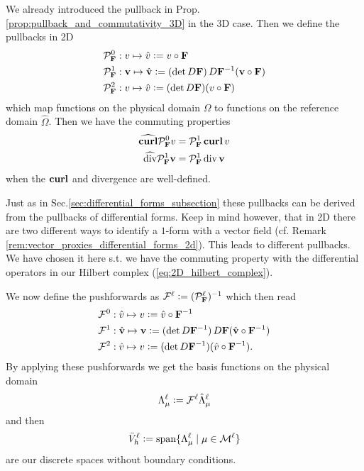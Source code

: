\documentclass[../master_thesis.tex]{subfiles}
\begin{document}
We already introduced the pullback in Prop.\,\ref{prop:pullback_and_commutativity_3D} in the 3D case. 
Then we define the pullbacks in 2D
\begin{align*}
    &\mathcal{P}_\mathbf{F}^0: v \mapsto \hat{v} \vcentcolon= v \circ \mathbf{F}
    \\ &\mathcal{P}_\mathbf{F}^1: \mathbf{v} \mapsto \hat{\mathbf{v}} 
        \vcentcolon= (\det D\mathbf{F} )\,D\mathbf{F}^{-1} (\mathbf{v} \circ \mathbf{F})
    \\ &\mathcal{P}_\mathbf{F}^2: v \mapsto \hat{v} \vcentcolon= (\det D\mathbf{F}) (v\circ \mathbf{F})
\end{align*}
which map functions on the physical domain $\Omega$ to functions on the reference domain 
$\hat{\Omega}$. Then we have the commuting properties
\begin{align*}
    \widehat{\veccurl} \mathcal{P}_\mathbf{F}^0 v &= \mathcal{P}_\mathbf{F}^1 \veccurl v
    \\ \widehat{\diver} \mathcal{P}_\mathbf{F}^1 \mathbf{v} &= \mathcal{P}_\mathbf{F}^1 \diver \mathbf{v}
\end{align*}
when the $\veccurl$ and divergence are well-defined.
\begin{remark}
    Just as in Sec.\ref{sec:differential_forms_subsection} 
    these pullbacks can be derived from the pullbacks of differential forms.
    Keep in mind however, that in 2D there are two different ways to identify a $1$-form 
    with a vector field (cf. Remark \ref{rem:vector_proxies_differential_forms_2d}). 
    This leads to different pullbacks. We have chosen it 
    here s.t. we have the commuting property with the differential operators in 
    our Hilbert complex (\ref{eq:2D_hilbert_complex}).
\end{remark}

We now define the pushforwards as 
$\mathcal{F}^\ell \vcentcolon= (\mathcal{P}_\mathbf{F}^\ell)^{-1}$ 
which then read
\begin{align*}
    &\mathcal{F}^0:  \hat{v}\mapsto v  \vcentcolon= \hat{v} \circ \mathbf{F}^{-1}
    \\ &\mathcal{F}^1: \hat{\mathbf{v}}  \mapsto \mathbf{v}
        \vcentcolon= (\det D\mathbf{F}^{-1}) \,D\mathbf{F} (\hat{\mathbf{v}} \circ \mathbf{F}^{-1})
    \\ &\mathcal{F}^2:  \hat{v} \mapsto  v\vcentcolon= (\det D\mathbf{F}^{-1}) (\hat{v}\circ \mathbf{F}^{-1}).
\end{align*}
By applying these pushforwards we get the basis functions on the physical domain
\begin{align*}
    \Lambda^\ell_{\mu} \vcentcolon= \mathcal{F}^\ell \hat{\Lambda}^\ell_{\mu}
\end{align*}
and then 
\begin{align*}
    \bar{V}_h^\ell \vcentcolon= \text{span} \{ \Lambda^\ell_{\mu} \mid \mu \in \mathcal{M}^\ell \}
\end{align*}
are our discrete spaces without boundary conditions.
\end{document}
